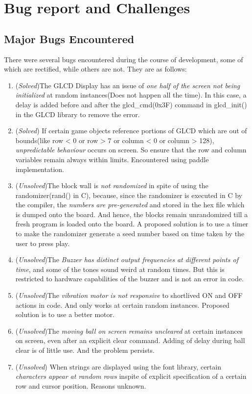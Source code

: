 \documentclass[a4paper,12pt,oneside]{book}
\begin{document}
\chapter{Bug report and Challenges}
\section{Major Bugs Encountered}
\qquad There were several bugs encountered during the course of development, some of which are rectified, while others are not. They are as follows:
\begin{enumerate}
\item (\textit{Solved})The GLCD Display has an issue of \textit{one half of the screen not being initialized} at random instances(Does not happen all the time). In this case, a delay is added before and after the glcd\_cmd(0x3F) command in glcd\_init() in the GLCD library to remove the error.
\item (\textit{Solved}) If certain game objects reference portions of GLCD which are out of bounds(like row < 0 or row > 7 or column < 0 or column > 128), \textit{unpredictable behaviour} occurs on screen. So ensure that the row and column variables remain always within limits. Encountered using paddle implementation.
\item (\textit{Unsolved})The block wall is \textit{not randomized} in spite of using the randomizer(rand() in C), because, since the randomizer is executed in C by the compiler, the \textit{numbers are pre-generated} and stored in the hex file which is dumped onto the board. And hence, the blocks remain unrandomized till a fresh program is loaded onto the board. A proposed solution is to use a timer to make the randomizer generate a seed number based on time taken by the user to press play. 
\item (\textit{Unsolved})The \textit{Buzzer has distinct output frequencies at different points of time}, and some of the tones sound weird at random times. But this is restricted to hardware capabilities of the buzzer and is not an error in code. 
\item (\textit{Unsolved})The \textit{vibration motor is not responsive} to shortlived ON and OFF actions in code. And only works at certain random instances. Proposed solution is to use a better motor.
\item (\textit{Unsolved})The \textit{moving ball on screen remains uncleared} at certain instances on screen, even after an explicit clear command. Adding of delay during ball clear is of little use. And the problem persists.
\item (\textit{Unsolved}) When strings are displayed using the font library, certain \textit{characters appear at random rows} inspite of explicit specification of a certain row and cursor position. Reasons unknown. 
\end{enumerate}
\end{document}
